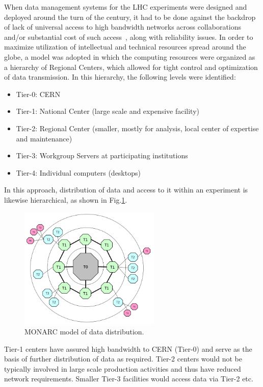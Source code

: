 When data management systems for the LHC experiments were designed and deployed around the turn of the century, it had to be done
against the backdrop of lack of universal access to high bandwidth networks across collaborations and/or substantial cost of such access~\cite{monarc},
along with reliability issues.
In order to maximize utilization of intellectual and technical resources spread around the globe, a model was adopted in which the computing resources
were organized as a hierarchy of Regional Centers, which allowed for tight control and optimization of data transmission. In this hierarchy, the following
levels were identified:
\begin{itemize}
\item Tier-0: CERN
\item Tier-1: National Center (large scale and expensive facility)
\item Tier-2: Regional Center (smaller, mostly for analysis, local center of expertise and maintenance)
\item Tier-3: Workgroup Servers at participating institutions
\item Tier-4: Individual computers (desktops)
\end{itemize}
\noindent
In this approach, distribution of data and access to it within an experiment is likewise hierarchical, as shown in Fig.\ref{fig:monarc}.
\begin{figure}[h!]
\centering
\includegraphics[width=0.6\textwidth]{monarc-model.png}
\caption{MONARC model of data distribution.}
\label{fig:monarc}
\end{figure}
Tier-1 centers have assured high bandwidth to CERN (Tier-0) and serve as the basis of further distribution of data
as required. Tier-2 centers would not be typically involved in large scale production activities and thus have reduced
network requirements. Smaller Tier-3 facilities would access data via Tier-2 etc.

